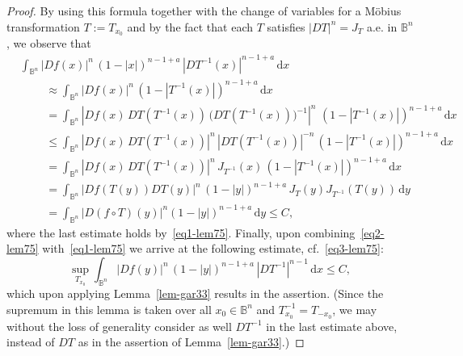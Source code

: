 \documentclass[11pt,a4paper,reqno]{amsart}
\theoremstyle{definition}
\newcommand{\B}{\mathbb{B}^n}
\newcommand{\ud}{\mathrm {d}}
\numberwithin{komcounter}{section}
\begin{document}
\begin{proof}
By using this formula together with the change of variables for a M\"obius transformation $T:=T_{x_0}$ and by the fact that each $T$ satisfies $|DT|^n=J_T$ a.e. in $\B$, we observe that
\begin{align}
& \int_{\B} |Df(x)|^{n}\,(1-|x|)^{n-1+a}\,|DT^{-1}(x)|^{n-1+a}\,\ud x \nonumber \\
&\phantom{AAA} \approx \int_{\B} |Df(x)|^{n}\, (1-|T^{-1}(x)|)^{n-1+a}\,\ud x  \nonumber \\
&\phantom{AAA} =\int_{\B} |Df(x)\,DT(T^{-1}(x))\,\big(DT(T^{-1}(x))\big)^{-1}|^{n}\, \,(1-|T^{-1}(x)|)^{n-1+a}\,\ud x \nonumber \\
&\phantom{AAA} \leq  \int_{\B} |Df(x)\,DT(T^{-1}(x))|^{n}\,|DT(T^{-1}(x))|^{-n}\,(1-|T^{-1}(x)|)^{n-1+a}\,\ud x \nonumber \\
&\phantom{AAA} = \int_{\B} |Df(x)\,DT(T^{-1}(x))|^{n}\,J_{T^{-1}}(x)\,(1-|T^{-1}(x)|)^{n-1+a}\,\ud x \nonumber \\
&\phantom{AAA} = \int_{\B} |Df(T(y)) DT(y)|^{n}\,(1-|y|)^{n-1+a}\,J_T(y) J_{T^{-1}}(T(y)) \,\ud y \nonumber \\
&\phantom{AAA} =\int_{\B} |D(f\circ T)(y)|^{n}(1-|y|)^{n-1+a}\,\ud y \leq C, \label{eq2-lem75}
\end{align} 
where the last estimate holds by~\eqref{eq1-lem75}.  Finally, upon combining~\eqref{eq2-lem75} with~\eqref{eq1-lem75} we arrive at the following estimate, cf.~\eqref{eq3-lem75}:
\[
 \sup_{T_{x_0}} \int_{\B} |Df(y)|^{n}\,(1-|y|)^{n-1+a}\,|DT^{-1}|^{n-1}\,\ud x \leq C,
\]
which upon applying Lemma~\ref{lem-gar33} results in the assertion. (Since the supremum in this lemma is taken over all $x_0\in \B$ and $T_{x_0}^{-1}=T_{-x_0}$, we may without the loss of generality consider as well $DT^{-1}$ in the last estimate above, instead of $DT$ as in the assertion of Lemma~\ref{lem-gar33}.)
\end{proof}
\end{document}
